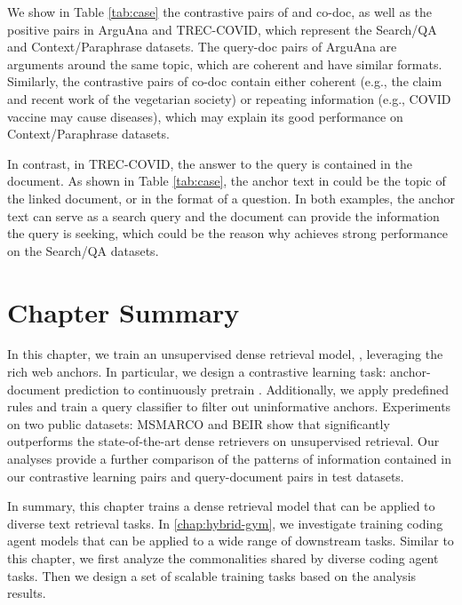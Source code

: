 We show in Table \ref{tab:case} the contrastive pairs of \anchordrours and co-doc, as well as the positive pairs in ArguAna and TREC-COVID, which represent the Search/QA and Context/Paraphrase datasets.
The query-doc pairs of ArguAna are arguments around the same topic, which are coherent and have similar formats.
Similarly, the contrastive pairs of co-doc contain either coherent (e.g., the claim and recent work of the vegetarian society) or repeating information (e.g., COVID vaccine may cause diseases), which may explain its good performance on Context/Paraphrase datasets.

In contrast, in TREC-COVID, the answer to the query is contained in the document.
As shown in Table \ref{tab:case}, the anchor text in \anchordrours could be the topic of the linked document, or in the format of a question. 
In both examples, the anchor text can serve as a search query and the document can provide the information the query is seeking,
which could be the reason why \anchordrours achieves strong performance on the Search/QA datasets.






\section{Chapter Summary}
In this chapter, we train an unsupervised dense retrieval model, \anchordrours, leveraging the rich web anchors.
In particular, we design a contrastive learning task: anchor-document prediction to continuously pretrain \anchordrours.
Additionally, we apply predefined rules and train a query classifier to filter out uninformative anchors.
Experiments on two public datasets: MSMARCO and BEIR show that \anchordrours significantly outperforms the state-of-the-art dense retrievers on unsupervised retrieval. Our analyses provide a further comparison of the patterns of information contained in our contrastive learning pairs and query-document pairs in test datasets. 

In summary, this chapter trains a dense retrieval model that can be applied to diverse text retrieval tasks.
In \autoref{chap:hybrid-gym}, we investigate training coding agent models that can be applied to a wide range of downstream tasks.
Similar to this chapter, we first analyze the commonalities shared by diverse coding agent tasks. Then we design a set of scalable training tasks based on the analysis results.